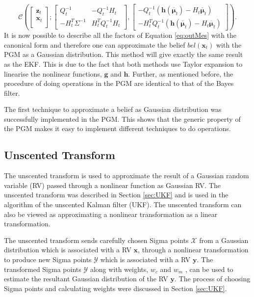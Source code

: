 \documentclass[12pt,oneside,openany,a4paper, %
afrikaans,english,
]{memoir}
\numberwithin{equation}{chapter}
\begin{document}
\begin{equation}
\mathcal{C}\left(
\begin{bmatrix}
\bm{z}_t \\
\bm{x}_{t} \\
\end{bmatrix};
\begin{bmatrix}
Q_t^{-1}  &  -Q_t^{-1}H_t\\
-H_t^T\Sigma^{-1} & H_t^T Q_t^{-1}H_t
\end{bmatrix}
, 
\begin{bmatrix}
-Q_t^{-1}(\bm{h}(\bm{\overline{\mu}}_t) - H_t\bm{\overline{\mu}}_{t})\\
-H_t^T Q_t^{-1}(\bm{h}(\bm{\overline{\mu}}_t) - H_t\bm{\overline{\mu}}_{t})
\end{bmatrix}
\right).
\end{equation}
It is now possible to describe all the factors of Equation \ref{eq:outMes} with the canonical form and therefore one can approximate the belief $bel(\bm{x}_t)$ with the PGM as a Gaussian distribution. This method will give exactly the same result as the EKF. This is due to the fact that both methods use Taylor expansion to linearise the nonlinear functions, $\bm{g}$ and $\bm{h}$. Further, as mentioned before, the procedure of doing operations in the PGM are identical to that of the Bayes filter.

The first technique to approximate a belief as Gaussian distribution was successfully implemented in the PGM. This shows that the generic property of the PGM makes it easy to implement different techniques to do operations.

\subsection{Unscented Transform}
The unscented transform is used to approximate the result of a Gaussian random variable (RV) passed through a nonlinear function as Gaussian RV. The unscented transform was described in Section \ref{sec:UKF} and is used in the algorithm of the unscented Kalman filter (UKF). The unscented transform can also be viewed as approximating a nonlinear transformation as a linear transformation.

The unscented transform sends carefully chosen Sigma points $\mathcal{X}$ from a Gaussian distribution which is associated with a RV $\bm{x}$, through a nonlinear transformation to produce new Sigma points $\mathcal{Y}$ which is associated with a RV $\bm{y}$. The transformed Sigma points $\mathcal{Y}$ along with weights, $w_c$ and $w_m$ , can be used to estimate the resultant Gaussian distribution of the RV $\bm{y}$. The process of choosing Sigma points and calculating weights were discussed in Section \ref{sec:UKF}.
\end{document}
